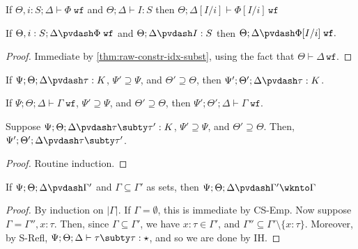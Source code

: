 \begin{theorem}
If $\Theta, i : S ; \Delta \vdash \Phi \; \texttt{wf}$ and $\Theta ; \Delta \vdash I : S$ then $\Theta ; \Delta[I/i] \vdash \Phi[I/i] \, \texttt{wf}$
\label{thm:raw-constr-idx-subst}
\end{theorem}


\begin{theorem}
If $\Theta, i : S ; \Delta \pvdash \Phi \; \texttt{wf}$ and $\Theta ; \Delta \pvdash I : S$ then $\Theta ; \Delta \pvdash \Phi[I/i] \; \texttt{wf}.$
\label{thm:constr-idx-subst}
\end{theorem}
\begin{proof}
Immediate by \autoref{thm:raw-constr-idx-subst}, using the fact that $\Theta \vdash \Delta \, \texttt{wf}$.
\end{proof}


\begin{theorem}
If $\Psi ; \Theta ; \Delta \pvdash \tau : K$, $\Psi' \supseteq \Psi$, and $\Theta' \supseteq \Theta$, then
$\Psi' ; \Theta' ; \Delta \pvdash \tau : K$.
\end{theorem}

\begin{theorem}
If $\Psi ; \Theta ; \Delta \vdash \Gamma \; \texttt{wf}$, $\Psi' \supseteq \Psi$, and $\Theta' \supseteq \Theta$, then
$\Psi' ; \Theta' ; \Delta \vdash \Gamma \; \texttt{wf}$.
\end{theorem}

\typeidxsubst*


\begin{theorem}
Suppose $\Psi ; \Theta ; \Delta \pvdash \tau \subty \tau' : K$, $\Psi' \supseteq \Psi$, and $\Theta' \supseteq \Theta$.
Then, $\Psi' ; \Theta' ; \Delta \pvdash \tau \subty \tau'$.
\end{theorem}

\subtystreng*
\begin{proof}
Routine induction.
\end{proof}


\begin{theorem}
If $\Psi ; \Theta ; \Delta \pvdash \Gamma'$ and $\Gamma \subseteq \Gamma'$ as sets, then $\Psi ; \Theta ; \Delta \pvdash \Gamma' \wknto \Gamma$
\label{thm:ctx-sub-subset1}
\end{theorem}
\begin{proof}
By induction on $|\Gamma|$.
If $\Gamma = \emptyset$, this is immediate by CS-Emp.
Now suppose $\Gamma = \Gamma'', x : \tau$. Then, since $\Gamma \subseteq \Gamma'$, we have $x : \tau \in \Gamma'$, and $\Gamma'' \subseteq \Gamma' \setminus \{x : \tau\}$. Moreover, by S-Refl, $\Psi ; \Theta ; \Delta \vdash \tau \subty \tau : \star$, and so we are done by IH.
\end{proof}

